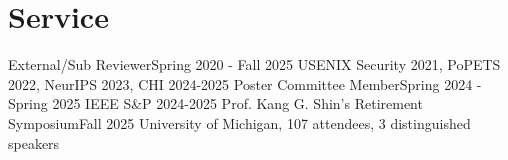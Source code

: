 \section{Service}
\CVSubHeadingListStart
    \CVSubheading
      {External/Sub Reviewer}{Spring 2020 - Fall 2025}
      {USENIX Security 2021, PoPETS 2022, NeurIPS 2023, CHI 2024-2025}{}
    \CVSubheading
    {Poster Committee Member}{Spring 2024 - Spring 2025}
      {IEEE S\&P 2024-2025}{}
    \CVSubheading
    {Prof. Kang G. Shin's Retirement Symposium}{Fall 2025}
      {University of Michigan, 107 attendees, 3 distinguished speakers}{}
  \CVSubHeadingListEnd